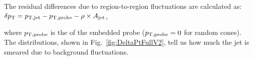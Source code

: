 \documentclass[a4paper]{jpconf}
\begin{document}
The residual \pT{} differences due to region-to-region fluctuations are calculated as:
$\delta p_{\rm T} = p_{\rm T,jet} - p_{\rm T,probe} -\rho \times A_{\rm jet}$, 

where $p_{\rm T,probe}$ is the \pT{} of the embedded probe ($p_{\rm T,probe}=0$ for random cones).
The \dpT{} distributions, shown in Fig.~\ref{fig:DeltaPtFullV2}, tell us how much the jet \pT{} 
is smeared due to background fluctuations.

\end{document}
